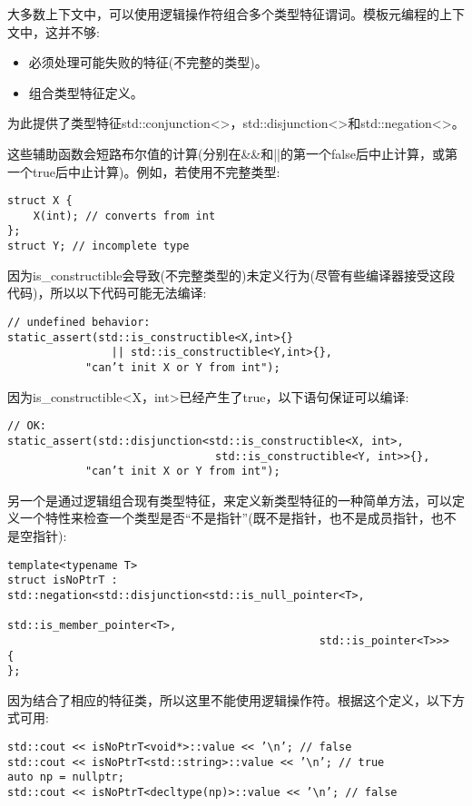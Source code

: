 
大多数上下文中，可以使用逻辑操作符组合多个类型特征谓词。模板元编程的上下文中，这并不够:

\begin{itemize}
\item 
必须处理可能失败的特征(不完整的类型)。

\item 
组合类型特征定义。
\end{itemize}

为此提供了类型特征std::conjunction<>，std::disjunction<>和std::negation<>。

这些辅助函数会短路布尔值的计算(分别在\&\&和||的第一个false后中止计算，或第一个true后中止计算)。例如，若使用不完整类型:

\begin{lstlisting}[style=styleCXX]
struct X {
	X(int); // converts from int
};
struct Y; // incomplete type
\end{lstlisting}

因为is\_constructible会导致(不完整类型的)未定义行为(尽管有些编译器接受这段代码)，所以以下代码可能无法编译:

\begin{lstlisting}[style=styleCXX]
// undefined behavior:
static_assert(std::is_constructible<X,int>{}
				|| std::is_constructible<Y,int>{},
			"can’t init X or Y from int");
\end{lstlisting}

因为is\_constructible<X，int>已经产生了true，以下语句保证可以编译:

\begin{lstlisting}[style=styleCXX]
// OK:
static_assert(std::disjunction<std::is_constructible<X, int>,
								std::is_constructible<Y, int>>{},
			"can’t init X or Y from int");
\end{lstlisting}

另一个是通过逻辑组合现有类型特征，来定义新类型特征的一种简单方法，可以定义一个特性来检查一个类型是否“不是指针”(既不是指针，也不是成员指针，也不是空指针):

\begin{lstlisting}[style=styleCXX]
template<typename T>
struct isNoPtrT : std::negation<std::disjunction<std::is_null_pointer<T>,
												std::is_member_pointer<T>,
												std::is_pointer<T>>>
{
};
\end{lstlisting}

因为结合了相应的特征类，所以这里不能使用逻辑操作符。根据这个定义，以下方式可用:

\begin{lstlisting}[style=styleCXX]
std::cout << isNoPtrT<void*>::value << ’\n’; // false
std::cout << isNoPtrT<std::string>::value << ’\n’; // true
auto np = nullptr;
std::cout << isNoPtrT<decltype(np)>::value << ’\n’; // false
\end{lstlisting}

